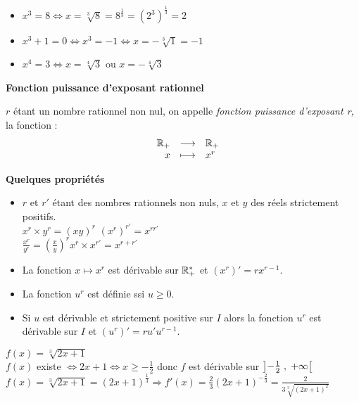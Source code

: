 \begin{example}
\begin{itemize}
\item $ x^3=8 \Longleftrightarrow x=\sqrt[3]{8}= 8^{\frac{1}{3}} = (2^3)^{\frac{1}{3}}=2$
\item $ x^3+1=0\Longleftrightarrow x^3=-1 \Longleftrightarrow x=-\sqrt[3]{1}= -1$
\item $ x^4= 3 \Longleftrightarrow x= \sqrt[4]{3}$ ou $ x= -\sqrt[4]{3} $  
 \end{itemize}
\end{example}
\textbf{\color{blue}Fonction puissance d'exposant rationnel}
\begin{definition}
$ r $ étant un nombre rationnel non nul, on appelle \emph{fonction puissance d'exposant r,} la fonction : 
\renewcommand{\arraystretch}{1}
\[\begin{array}{lrcl}
    &  \mathbb{R}_+  & \longrightarrow & \mathbb{R}_+ \\ 
  &  x & \longmapsto & x^{r}
   \end{array}\]
\end{definition}
\textbf{\color{blue}Quelques propriétés  }
\begin{itemize}
\item $ r$ et $r' $ étant des nombres rationnels non nuls, $x $ et $ y$ des réels strictement positifs.\\ 

\hspace{2cm} \colorbox{green!20!} {$ x^{r}\times y^{r}= (xy)^{r} $ \qquad \qquad  $ (x^{r})^{r'}=x^{rr'} $} \\

\hspace{2cm}  \colorbox{green!20!}{$ \frac{x^{r}}{y^{r}}=(\frac{x}{y})^{r} $\qquad \qquad  $ x^{r}\times x^{r'}=x^{r+r'} $}\\

\item La fonction $x  \longmapsto x^{r}  $ est dérivable sur $ \mathbb{R}_+^* $ et $( x^{r})'=rx^{r-1}$.
\item La fonction $ u^{r} $ est définie ssi $ u\geq 0. $
  \item   Si $ u $ est dérivable et strictement positive sur $ I $ alors la fonction  $ u^{r} $ est dérivable sur $ I $ et $ (u^{r})'=ru'u^{r-1} $.
 \end{itemize}
 \begin{example}
 $ f(x)= \sqrt[3]{2x+1} $\\
 $ f(x) $  existe $ \Leftrightarrow 2x+1 \Leftrightarrow x \geq -\frac{1}{2} $ donc $ f $ est dérivable sur $ \left]-\frac{1}{2} \;,\; +\infty\right[ $\\
  $ f(x)= \sqrt[3]{2x+1}=(2x+1)^{\frac{1}{3}}\Longrightarrow f'(x)=\frac{2}{3}(2x+1)^{-\frac{2}{3}}=\frac{2}{3\sqrt[3]{(2x+1)^2}} $
 \end{example}



